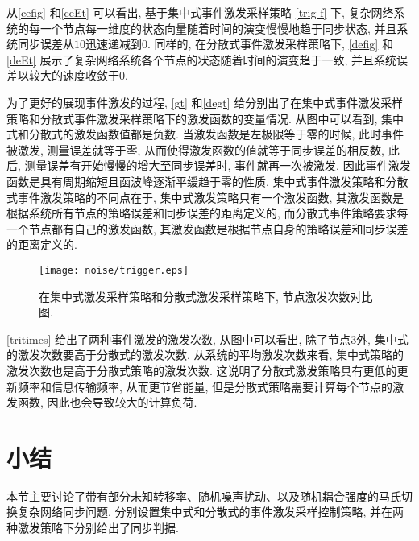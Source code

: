     从\autoref{cefig} 和\autoref{ceEt} 可以看出, 基于集中式事件激发采样策略 \eqref{trig-f} 下, 复杂网络系统的每一个节点每一维度的状态向量随着时间的演变慢慢地趋于同步状态, 并且系统同步误差从$10$迅速递减到$0$. 同样的, 在分散式事件激发采样策略下, \autoref{defig} 和\autoref{deEt} 展示了复杂网络系统各个节点的状态随着时间的演变趋于一致, 并且系统误差以较大的速度收敛于$0$.

    为了更好的展现事件激发的过程, \autoref{gt} 和\autoref{degt} 给分别出了在集中式事件激发采样策略和分散式事件激发采样策略下的激发函数的变量情况. 从图中可以看到, 集中式和分散式的激发函数值都是负数. 当激发函数是左极限等于零的时候, 此时事件被激发, 测量误差就等于零, 从而使得激发函数的值就等于同步误差的相反数, 此后, 测量误差有开始慢慢的增大至同步误差时, 事件就再一次被激发. 因此事件激发函数是具有周期缩短且函波峰逐渐平缓趋于零的性质. 集中式事件激发策略和分散式事件激发策略的不同点在于, 集中式激发策略只有一个激发函数, 其激发函数是根据系统所有节点的策略误差和同步误差的距离定义的, 而分散式事件策略要求每一个节点都有自己的激发函数, 其激发函数是根据节点自身的策略误差和同步误差的距离定义的.

\begin{figure}
\begin{center}
\texttt{[image: noise/trigger.eps]}\caption{在集中式激发采样策略和分散式激发采样策略下, 节点激发次数对比图.}\label{tritimes}
\end{center}
\end{figure}

    \autoref{tritimes} 给出了两种事件激发的激发次数, 从图中可以看出, 除了节点$3$外, 集中式的激发次数要高于分散式的激发次数. 从系统的平均激发次数来看, 集中式策略的激发次数也是高于分散式策略的激发次数. 这说明了分散式激发策略具有更低的更新频率和信息传输频率, 从而更节省能量, 但是分散式策略需要计算每个节点的激发函数, 因此也会导致较大的计算负荷.

\section{小结}
    本节主要讨论了带有部分未知转移率、随机噪声扰动、以及随机耦合强度的马氏切换复杂网络同步问题. 分别设置集中式和分散式的事件激发采样控制策略, 并在两种激发策略下分别给出了同步判据.
